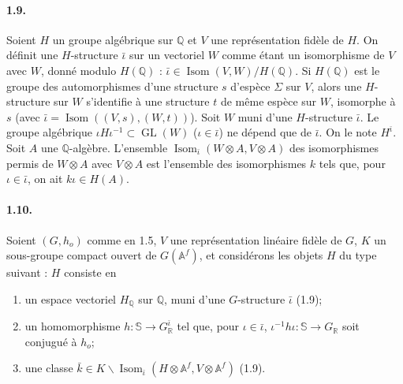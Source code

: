 \documentclass[10pt]{article}
\newcommand{\Af}{\mathbb A^f}
\newcommand{\Q}{\mathbb Q}
\newcommand{\R}{\mathbb R}
\newcommand{\bS}{\mathbb S}
\newcommand{\GL}{\operatorname{GL}}
\newcommand{\Isom}{\operatorname{Isom}}
\begin{document}
\paragraph{1.9.} Soient $H$ un groupe algébrique sur $\Q$ et $V$ une représentation fidèle de $H$. On définit une $H$-structure $\bar\iota$ sur un vectoriel $W$ comme étant un isomorphisme de $V$ avec $W$, donné modulo $H(\Q)$ : $\bar\iota\in\Isom(V,W)/H(\Q)$. Si $H(\Q)$ est le groupe des automorphismes d'une structure $s$ d'espèce $\Sigma$ sur $V$, alors une $H$-structure sur $W$ s'identifie à une structure $t$ de même espèce sur $W$, isomorphe à $s$ (avec $\bar\iota=\Isom((V,s),(W,t))$). Soit $W$ muni d'une $H$-structure $\bar\iota$. Le groupe algébrique $\iota H\iota^{-1}\subset\GL(W)$ ($\iota\in\bar\iota$) ne dépend que de $\bar\iota$. On le note $H^{\bar\iota}$. Soit $A$ une $\Q$-algèbre. L'ensemble $\Isom_{\bar\iota}(W\otimes A,V\otimes A)$ des isomorphismes permis de $W\otimes A$ avec $V\otimes A$ est l'ensemble des isomorphismes $k$ tels que, pour $\iota\in\bar\iota$, on ait $k\iota\in H(A)$.

\paragraph{1.10.} Soient $(G,h_o)$ comme en 1.5, $V$ une représentation linéaire fidèle de $G$, $K$ un sous-groupe compact ouvert de $G(\Af)$, et considérons les objets $H$ du type suivant : $H$ consiste en
\begin{enumerate}[label=(\alph*),leftmargin=2.6em]
\item un espace vectoriel $H_\Q$ sur $\Q$, muni d'une $G$-structure $\bar\iota$ (1.9);
\item un homomorphisme $h:\bS\to G^{\bar\iota}_\R$ tel que, pour $\iota\in\bar\iota$, $\iota^{-1}h\iota:\bS\to G_\R$ soit conjugué à $h_o$;
\item une classe $\bar k\in K\backslash\Isom_{\bar\iota}(H\otimes\Af,V\otimes\Af)$ (1.9).
\end{enumerate}
\end{document}
